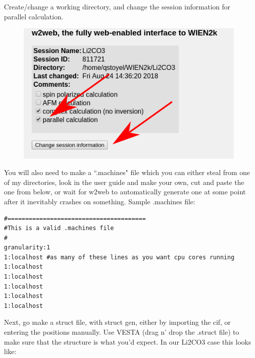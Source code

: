 \documentclass[12pt]{article}
\begin{document}
Create/change a working directory, and change the session information for parallel calculation.
	
	\begin{figure}[H]
		\includegraphics[scale=0.5]{./images/parallel.png}
	\end{figure}
	
You will also need to make a ``.machines" file which you can either steal from one of my directories, look in the user guide and make your own, cut and paste the one from below, or wait for w2web to automatically generate one at some point after it inevitably crashes on something.
Sample .machines file: 

\begin{lstlisting}
#=======================================
#This is a valid .machines file
#
granularity:1
1:localhost #as many of these lines as you want cpu cores running
1:localhost
1:localhost
1:localhost
1:localhost
1:localhost

\end{lstlisting}

Next, go make a struct file, with struct gen, either by importing the cif, or entering the positions manually.  Use VESTA (drag n' drop the .struct file) to make sure that the structure is what you'd expect. 
In our Li2CO3 case this looks like: 
\end{document}
